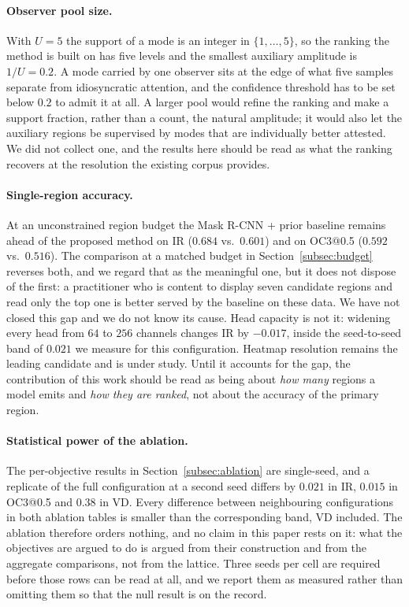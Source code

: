 \documentclass[preprint,12pt]{elsarticle}
\begin{document}
\paragraph{Observer pool size.} With $U=5$ the support of a mode is an integer
in $\{1,\ldots,5\}$, so the ranking the method is built on has five levels and
the smallest auxiliary amplitude is $1/U = 0.2$. A mode carried by one
observer sits at the edge of what five samples separate from idiosyncratic
attention, and the confidence threshold has to be set below $0.2$ to admit it
at all. A larger pool would refine the ranking and make a support fraction,
rather than a count, the natural amplitude; it would also let the auxiliary
regions be supervised by modes that are individually better attested. We did
not collect one, and the results here should be read as what the ranking
recovers at the resolution the existing corpus provides.

\paragraph{Single-region accuracy.} At an unconstrained region budget the
Mask R-CNN + prior baseline remains ahead of the proposed method on IR
($0.684$ vs.\ $0.601$) and on OC3@0.5 ($0.592$ vs.\ $0.516$). The comparison at
a matched budget in Section~\ref{subsec:budget} reverses both, and we regard
that as the meaningful one, but it does not dispose of the first: a
practitioner who is content to display seven candidate regions and read only
the top one is better served by the baseline on these data. We have not closed
this gap and we do not know its cause. Head capacity is not it: widening every
head from $64$ to $256$ channels changes IR by $-0.017$, inside the
seed-to-seed band of $0.021$ we measure for this configuration. Heatmap
resolution remains the leading candidate and is under study. Until it
accounts for the gap, the contribution of this work should be read as being about
\emph{how many} regions a model emits and \emph{how they are ranked}, not about
the accuracy of the primary region.

\paragraph{Statistical power of the ablation.} The per-objective results in
Section~\ref{subsec:ablation} are single-seed, and a replicate of the full
configuration at a second seed differs by $0.021$ in IR, $0.015$ in OC3@0.5 and
$0.38$ in VD. Every difference between neighbouring configurations in both
ablation tables is smaller than the corresponding band, VD included. The
ablation therefore orders nothing, and no claim in this paper rests on it:
what the objectives are argued to do is argued from their construction and from
the aggregate comparisons, not from the lattice. Three seeds per cell are
required before those rows can be read at all, and we report them as measured
rather than omitting them so that the null result is on the record.
\end{document}
